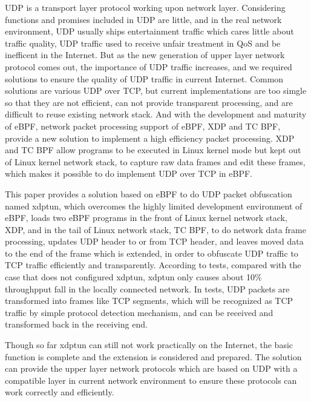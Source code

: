 \begin{abstract*}
  UDP is a transport layer protocol working upon network layer.
  Considering functions and promises included in UDP are little, and in the real network environment, UDP usually ships entertainment traffic which cares little about traffic quality, UDP traffic used to receive unfair treatment in QoS and be inefficent in the Internet.
  But as the new generation of upper layer network protocol comes out, the importance of UDP traffic increases, and we required solutions to ensure the quality of UDP traffic in current Internet.
  Common solutions are various UDP over TCP, but current implementations are too simgle so that they are not efficient, can not provide transparent processing, and are difficult to reuse existing network stack.
  And with the development and maturity of eBPF, network packet processing support of eBPF, XDP and TC BPF, provide a new solution to implement a high efficiency packet processing.
  XDP and TC BPF allow programs to be executed in Linux kernel mode but kept out of Linux kernel network stack, to capture raw data frames and edit these frames, which makes it possible to do implement UDP over TCP in eBPF.

  This paper provides a solution based on eBPF to do UDP packet obfuscation named xdptun, which overcomes the highly limited development environment of eBPF, loads two eBPF programs in the front of Linux kernel network stack, XDP, and in the tail of Linux network stack, TC BPF, to do network data frame processing, updates UDP header to or from TCP header, and leaves moved data to the end of the frame which is extended, in order to obfuscate UDP traffic to TCP traffic efficiently and transparently.
  According to tests, compared with the case that does not configured xdptun, xdptun only causes about 10\% throughpput fall in the locally connected network.
  In tests, UDP packets are transformed into frames like TCP segments, which will be recognized as TCP traffic by simple protocol detection mechanism, and can be received and transformed back in the receiving end.

  Though so far xdptun can still not work practically on the Internet, the basic function is complete and the extension is considered and prepared.
  The solution can provide the upper layer network protocols which are based on UDP with a compatible layer in current network environment to ensure these protocols can work correctly and efficiently.
\end{abstract*}
